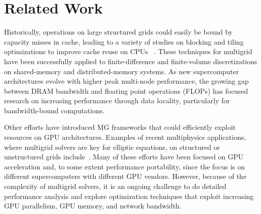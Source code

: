 \documentclass[sigconf]{acmart}
\begin{document}
\section{Related Work}
Historically, operations on large structured grids could easily be bound by capacity misses in cache, leading to a variety of studies on blocking and tiling optimizations to improve cache reuse on CPUs%
~\cite{Nguyen:2010:BOS:1884643.1884658,Zhou:2012,Yount:2016:YSK:3019129.3019133,Unat2016,Devito}. These techniques for multigrid have been successfully applied to finite-difference and finite-volume discretizations on shared-memory and distributed-memory systems.
As new supercomputer architectures evolve with higher peak multi-node performance, the growing gap between DRAM bandwidth and floating point operations (FLOPs) has focused research on increasing performance through data locality, particularly for bandwidth-bound computations.

Other efforts have introduced MG frameworks that could
efficiently exploit resources on GPU architectures. Examples
of recent multiphysics applications, where multigrid solvers
are key for elliptic equations, on structured or unstructured
grids include~\cite{Amrex,Anderson,Grete,mali}. Many of these efforts have been
focused on GPU acceleration and, to some extent performance
portability, since the focus is on different supercomputers with
different GPU vendors. However, because of the complexity
of multigrid solvers, it is an ongoing challenge to do detailed
performance analysis and explore optimization techniques
that exploit increasing GPU parallelism, GPU memory, and
network bandwidth.



\end{document}
